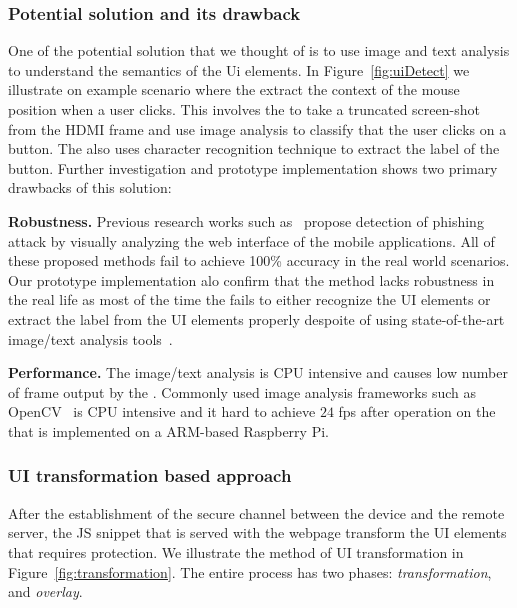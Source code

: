 \subsubsection{Potential solution and its drawback} One of the potential solution that we thought of is to use image and text analysis to understand the semantics of the Ui elements. In Figure~\ref{fig:uiDetect} we illustrate on example scenario where the \device extract the context of the mouse position when a user clicks. This involves the \device to take a truncated screen-shot from the HDMI frame and use image analysis to classify that the user clicks on a button. The \device also uses character recognition technique to extract the label of the button. Further investigation and prototype implementation shows two primary drawbacks of this solution:


\begin{mylist}
  \item \textbf{Robustness.} Previous research works such as~\cite{lukaSpoof,Chen:2010:DVS:1754393.1754394} propose detection of phishing attack by visually analyzing the web interface of the mobile applications. All of these proposed methods fail to achieve 100\% accuracy in the real world scenarios. Our prototype implementation alo confirm that the method lacks robustness in the real life as most of the time the \device fails to either recognize the UI elements or extract the label from the UI elements properly despoite of using state-of-the-art image/text analysis tools~\cite{opencv}.
  \item \textbf{Performance.} The image/text analysis is CPU intensive and causes low number of frame output by the \device. Commonly used image analysis frameworks such as OpenCV~\cite{opencv} is CPU intensive and it hard to achieve $24$ fps after operation on the \device that is implemented on a ARM-based Raspberry Pi.
\end{mylist}


\subsubsection{UI transformation based approach} After the establishment of the secure channel between the device and the remote server, the \name JS snippet that is served with the webpage transform the UI elements that requires protection. We illustrate the method of UI transformation in Figure~\ref{fig:transformation}. The entire process has two phases: \emph{transformation}, and \emph{overlay}.


